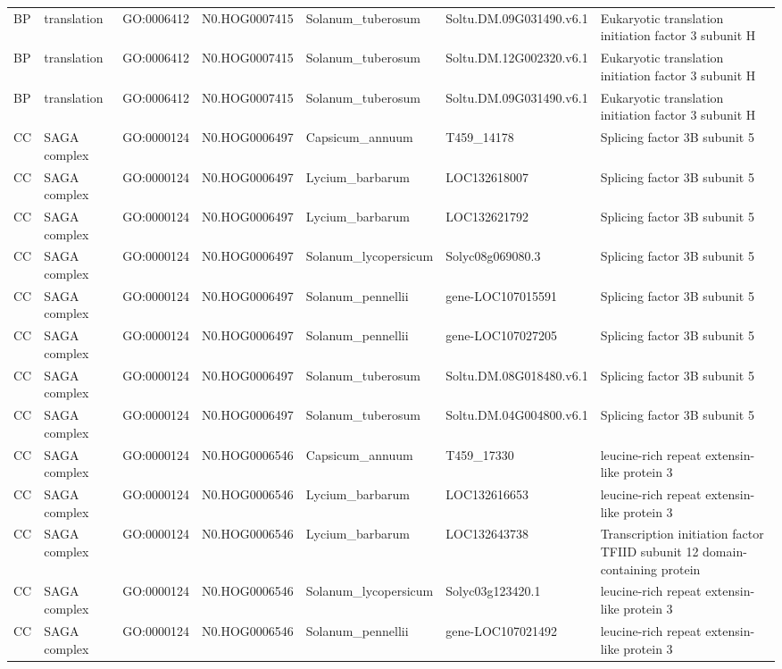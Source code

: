 \begin{table}
\begin{tabular}[t]{lllllll}
BP & translation & GO:0006412 & N0.HOG0007415 & Solanum\_tuberosum & Soltu.DM.09G031490.v6.1 & Eukaryotic translation initiation factor 3 subunit H\\
BP & translation & GO:0006412 & N0.HOG0007415 & Solanum\_tuberosum & Soltu.DM.12G002320.v6.1 & Eukaryotic translation initiation factor 3 subunit H\\
BP & translation & GO:0006412 & N0.HOG0007415 & Solanum\_tuberosum & Soltu.DM.09G031490.v6.1 & Eukaryotic translation initiation factor 3 subunit H\\
CC & SAGA complex & GO:0000124 & N0.HOG0006497 & Capsicum\_annuum & T459\_14178 & Splicing factor 3B subunit 5\\
CC & SAGA complex & GO:0000124 & N0.HOG0006497 & Lycium\_barbarum & LOC132618007 & Splicing factor 3B subunit 5\\
CC & SAGA complex & GO:0000124 & N0.HOG0006497 & Lycium\_barbarum & LOC132621792 & Splicing factor 3B subunit 5\\
CC & SAGA complex & GO:0000124 & N0.HOG0006497 & Solanum\_lycopersicum & Solyc08g069080.3 & Splicing factor 3B subunit 5\\
CC & SAGA complex & GO:0000124 & N0.HOG0006497 & Solanum\_pennellii & gene-LOC107015591 & Splicing factor 3B subunit 5\\
CC & SAGA complex & GO:0000124 & N0.HOG0006497 & Solanum\_pennellii & gene-LOC107027205 & Splicing factor 3B subunit 5\\
CC & SAGA complex & GO:0000124 & N0.HOG0006497 & Solanum\_tuberosum & Soltu.DM.08G018480.v6.1 & Splicing factor 3B subunit 5\\
CC & SAGA complex & GO:0000124 & N0.HOG0006497 & Solanum\_tuberosum & Soltu.DM.04G004800.v6.1 & Splicing factor 3B subunit 5\\
CC & SAGA complex & GO:0000124 & N0.HOG0006546 & Capsicum\_annuum & T459\_17330 & leucine-rich repeat extensin-like protein 3\\
CC & SAGA complex & GO:0000124 & N0.HOG0006546 & Lycium\_barbarum & LOC132616653 & leucine-rich repeat extensin-like protein 3\\
CC & SAGA complex & GO:0000124 & N0.HOG0006546 & Lycium\_barbarum & LOC132643738 & Transcription initiation factor TFIID subunit 12 domain-containing protein\\
CC & SAGA complex & GO:0000124 & N0.HOG0006546 & Solanum\_lycopersicum & Solyc03g123420.1 & leucine-rich repeat extensin-like protein 3\\
CC & SAGA complex & GO:0000124 & N0.HOG0006546 & Solanum\_pennellii & gene-LOC107021492 & leucine-rich repeat extensin-like protein 3\\

\end{tabular}
\end{table}
